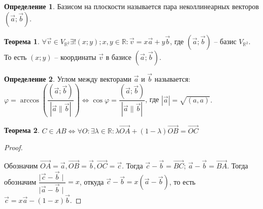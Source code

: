 \documentclass[12pt]{article}
\theoremstyle{definition}
\newtheorem{theorem}{Теорема}[section]
\newtheorem{definition}{Определение}
\newcommand{\R}{\mathbb{R}}
\begin{document}
\begin{definition}
    Базисом на плоскости называется пара неколлинеарных векторов $(\vec{a};\vec{b}).$
\end{definition}

\begin{theorem}
    $\forall \vec{\textit{v}}\in V_{\R^2} \exists!(x;y);x,y\in \R: \vec{\textit{v}}=x\vec{a}+y\vec{b}$, где $(\vec{a};\vec{b})$ -- базис $V_{\R^2}.$ То есть $(x;y)$ -- координаты $\vec{\textit{v}}$ в базисе $(\vec{a};\vec{b}).$
\end{theorem}

\begin{definition}
    Углом между векторами $\vec{a}$ и $\vec{b}$ называется: $\varphi=\arccos \left( \dfrac{(\vec{a};\vec{b})}{|\vec{a}\parallel\vec{b}|}\right)\Longleftrightarrow \cos \varphi = \dfrac{(\vec{a};\vec{b})}{|\vec{a}\parallel\vec{b}|}$, где $|\vec{a}|=\sqrt{(a,a)}.$
\end{definition}

\begin{theorem}
    $C\in AB \Longleftrightarrow \forall O: \exists \lambda \in \R: \lambda \overrightarrow{OA}+(1-\lambda) \overrightarrow{OB}=\overrightarrow{OC}$
\end{theorem}
    \begin{proof}
    $ $\par\nobreak\ignorespaces
    \begin{center}
    \end{center}
        Обозначим $\overrightarrow{OA}=\vec{a},\overrightarrow{OB}=\vec{b},\overrightarrow{OC}=\vec{c}$. Тогда $\vec{c}-\vec{b}=\overrightarrow {BC}$; $\vec{a}-\vec{b}=\overrightarrow{BA}$. Тогда обозначим $\dfrac{\mid \vec{c}-\vec{b}\mid }{\mid \vec{a}-\vec{b}\mid }=x$, откуда $\vec{c}-\vec{b}=x(\vec{a}-\vec{b})$, то есть $\vec{c}=x\vec{a}-(1-x)\vec{b}$.
    \end{proof}
\end{document}
